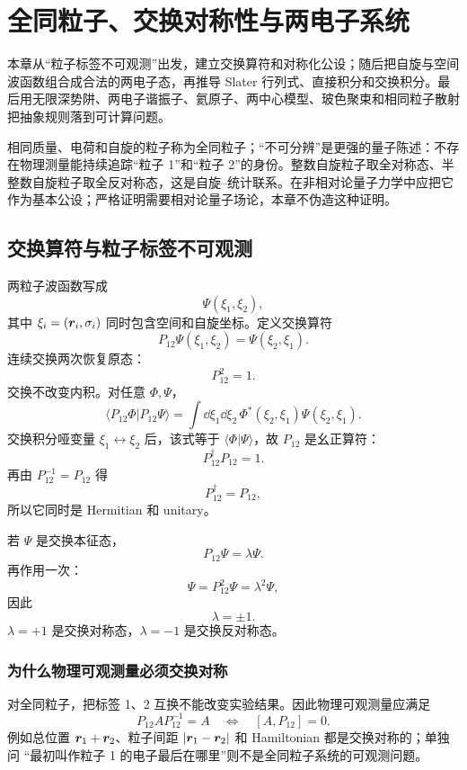 \chapter{全同粒子、交换对称性与两电子系统}
\label{chap:identical-particles}

\begin{mapbox}
本章从“粒子标签不可观测”出发，建立交换算符和对称化公设；随后把自旋与空间波函数组合成合法的两电子态，再推导 Slater 行列式、直接积分和交换积分。最后用无限深势阱、两电子谐振子、氦原子、两中心模型、玻色聚束和相同粒子散射把抽象规则落到可计算问题。
\end{mapbox}

\begin{pitfallbox}
相同质量、电荷和自旋的粒子称为全同粒子；“不可分辨”是更强的量子陈述：不存在物理测量能持续追踪“粒子 1”和“粒子 2”的身份。整数自旋粒子取全对称态、半整数自旋粒子取全反对称态，这是自旋--统计联系。在非相对论量子力学中应把它作为基本公设；严格证明需要相对论量子场论，本章不伪造这种证明。
\end{pitfallbox}

\section{交换算符与粒子标签不可观测}
两粒子波函数写成
\[
\Psi(\xi_1,\xi_2),
\]
其中 $\xi_i=(\bm{r}_i,\sigma_i)$ 同时包含空间和自旋坐标。定义交换算符
\[
P_{12}\Psi(\xi_1,\xi_2)
=\Psi(\xi_2,\xi_1).
\]
连续交换两次恢复原态：
\[
\boxed{P_{12}^2=1}.
\]
交换不改变内积。对任意 $\Phi,\Psi$，
\[
\langle P_{12}\Phi|P_{12}\Psi\rangle
=\int\dd\xi_1\dd\xi_2\,
\Phi^*(\xi_2,\xi_1)\Psi(\xi_2,\xi_1).
\]
交换积分哑变量 $\xi_1\leftrightarrow\xi_2$ 后，该式等于
$\langle\Phi|\Psi\rangle$，故 $P_{12}$ 是幺正算符：
\[
P_{12}^\dagger P_{12}=1.
\]
再由 $P_{12}^{-1}=P_{12}$ 得
\[
\boxed{P_{12}^\dagger=P_{12}},
\]
所以它同时是 Hermitian 和 unitary。

若 $\Psi$ 是交换本征态，
\[
P_{12}\Psi=\lambda\Psi.
\]
再作用一次：
\[
\Psi=P_{12}^2\Psi=\lambda^2\Psi,
\]
因此
\[
\boxed{\lambda=\pm1}.
\]
$\lambda=+1$ 是交换对称态，$\lambda=-1$ 是交换反对称态。

\subsection{为什么物理可观测量必须交换对称}
对全同粒子，把标签 1、2 互换不能改变实验结果。因此物理可观测量应满足
\[
\boxed{P_{12}AP_{12}^{-1}=A}
\quad\Longleftrightarrow\quad
[A,P_{12}]=0.
\]
例如总位置 $\bm{r}_1+\bm{r}_2$、粒子间距
$|\bm{r}_1-\bm{r}_2|$ 和 Hamiltonian 都是交换对称的；单独问
“最初叫作粒子 1 的电子最后在哪里”则不是全同粒子系统的可观测问题。

